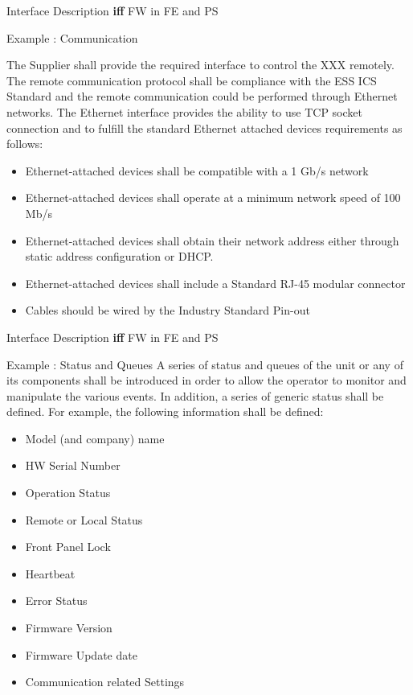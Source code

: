 \documentclass[
  9pt
  , table
  , ignorenonframetext
]{beamer}
\begin{document}
\begin{frame}{Interface Description \textbf{iff} FW in FE and PS}
  \begin{exampleblock}{Example : Communication}

  The Supplier shall provide the required interface to control the XXX remotely. The remote communication protocol shall be compliance with the ESS ICS Standard and the remote communication could be performed through Ethernet networks. The Ethernet interface provides the ability to use TCP socket connection and to fulfill the standard Ethernet attached devices requirements as follows:
  
\begin{itemize}
\item Ethernet-attached devices shall be compatible with a 1 Gb/s network
\item Ethernet-attached devices shall operate at a minimum network speed of 100 Mb/s
\item Ethernet-attached devices shall obtain their network address either through static address configuration or DHCP.
\item Ethernet-attached devices shall include a Standard RJ-45 modular connector
\item Cables should be wired by the Industry Standard Pin-out
\end{itemize}
\end{exampleblock}
\end{frame}


\begin{frame}{Interface Description \textbf{iff} FW in FE and PS}
  \begin{exampleblock}{Example : Status and Queues}
  A series of status and queues of the unit or any of its components shall be introduced in order to allow the operator to monitor and manipulate the various events. In addition, a series of generic status shall be defined. For example, the following information shall be defined:
  \begin{itemize}
  \item Model (and company) name
  \item HW Serial Number
  \item  Operation Status
  \item  Remote or Local Status
  \item  Front Panel Lock
  \item  Heartbeat
  \item  Error Status
  \item  Firmware Version
  \item  Firmware Update date
  \item  Communication related Settings
  \end{itemize}
\end{exampleblock}
\end{frame}
\end{document}
